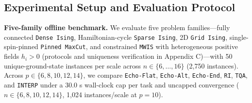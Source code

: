 \documentclass{article}
\theoremstyle{plain}
\theoremstyle{definition}
\begin{document}
\begin{table}[t]
\vskip 0.02in
\caption{End-to-end two-point shifted-circuit optimization ($n=10, p=10$, 1,024 MWIS instances, $\delta=0.10$ rad; $1+41t$ Stage-2 evaluations: $657, 1{,}313, 2{,}625$ for \texttt{Echo-Prior-Flat} vs. $32+2{,}625=2{,}657$ for \texttt{TQA}; $\infty$ rows give matched Adam and L-BFGS-B references, \%).}
\label{tab:5}
\vskip 0.01in
\centering
\footnotesize
\renewcommand{\arraystretch}{0.96}
\setlength{\tabcolsep}{5.5pt}
\vskip -0.10in
\end{table}

\subsection{Experimental Setup and Evaluation Protocol}\label{subsec:5_1}

\textbf{Five-family offline benchmark.} We evaluate five problem families---fully connected \texttt{Dense Ising}, Hamiltonian-cycle \texttt{Sparse Ising}, 2D \texttt{Grid Ising}, single-spin-pinned \texttt{Pinned MaxCut}, and constrained \texttt{MWIS} with heterogeneous positive fields $h_i>0$ (protocols and uniqueness verification in Appendix C)---with 50 unique-ground-state instances per scale across $n\in\{6,\ldots,16\}$ (2,750 instances). Across $p\in\{6,8,10,12,14\}$, we compare \texttt{Echo-Flat}, \texttt{Echo-Alt}, \texttt{Echo-End}, \texttt{RI}, \texttt{TQA}, and \texttt{INTERP} under a 30.0 s wall-clock cap per task and uncapped convergence ($n\in\{6,8,10,12,14\}$, 1,024 instances/scale at $p=10$).
\end{document}
